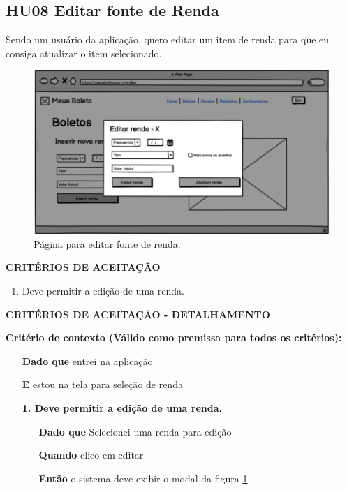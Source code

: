\subsection{HU08 Editar fonte de Renda}

Sendo um usuário da aplicação, quero editar um item de renda para que eu consiga atualizar o item selecionado.

\begin{figure}[htb]
	\caption{\label{fig:hu07}Página para editar fonte de renda.}
	\begin{center}
		\includegraphics[scale=0.5]{images/EditarBoletoRenda.png}
	\end{center}
\end{figure}

\textbf{CRITÉRIOS DE ACEITAÇÃO}

\begin{enumerate}
    \item Deve permitir a edição de uma renda.
\end{enumerate}

\textbf{CRITÉRIOS DE ACEITAÇÃO - DETALHAMENTO}

\textbf{Critério de contexto (Válido como premissa para todos os critérios):}

\begin{itemize}
    \item[\textbf{Dado que}] entrei na aplicação
    \item[\textbf{E}] estou na tela para seleção de renda
\end{itemize}


\begin{itemize}
    \item[] \textbf{1. Deve permitir a edição de uma renda.}

    \begin{itemize}
        \item[\textbf{Dado que}] Selecionei uma renda para edição
        \item[\textbf{Quando}] clico em editar
        \item[\textbf{Então}] o sistema deve exibir o modal da figura \ref{fig:hu07} 
    \end{itemize}
\end{itemize}

